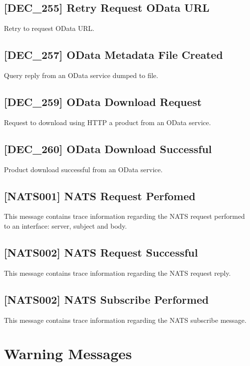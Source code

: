 \documentclass[dec_sum_main.tex]{subfiles}
\begin{document}
\subsection{[DEC\_255] Retry Request OData URL}
Retry to request OData URL.

\label{DEC257}
\subsection{[DEC\_257] OData Metadata File  Created}
Query reply from an OData service dumped to file.

\label{DEC259}
\subsection{[DEC\_259] OData Download Request}
Request to download using HTTP a product from an OData service.

\label{DEC260}
\subsection{[DEC\_260] OData Download Successful}
Product download successful from an OData service.

\label{NATS001}
\subsection{[NATS001] NATS Request Perfomed}
This message contains trace information regarding the NATS request performed to an interface: server, subject and body.

\label{NATS002}
\subsection{[NATS002] NATS Request Successful}
This message contains trace information regarding the NATS request reply.

\label{NATS003}
\subsection{[NATS002] NATS Subscribe Performed}
This message contains trace information regarding the NATS subscribe message.

\newpage

\section{Warning Messages}
\end{document}
